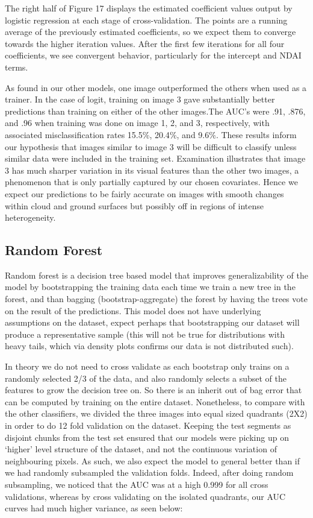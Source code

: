 \documentclass{article}\usepackage[]{graphicx}\usepackage[]{color}
\begin{document}
The right half of Figure 17 displays the estimated coefficient values output by logistic regression at each stage of cross-validation. The points are a running average of the previously estimated coefficients, so we expect them to converge towards the higher iteration values. After the first few iterations for all four coefficients, we see convergent behavior, particularly for the intercept and NDAI terms. 

As found in our other models, one image outperformed the others when used as a trainer. In the case of logit, training on image 3 gave substantially better predictions than training on either of the other images.The AUC's were .91, .876, and .96 when training was done on image 1, 2, and 3, respectively, with associated misclassification rates 15.5$\%$, 20.4$\%$, and 9.6$\%$. These results inform our hypothesis that images similar to image 3 will be difficult to classify unless similar data were included in the training set. Examination illustrates that image 3 has much sharper variation in its visual features than the other two images, a phenomenon that is only partially captured by our chosen covariates. Hence we expect our predictions to be fairly accurate on images with smooth changes within cloud and ground surfaces but possibly off in regions of intense heterogeneity.

\subsection{Random Forest}

Random forest is a decision tree based model that improves generalizability of the model by bootstrapping the training data each time we train a new tree in the forest, and than bagging (bootstrap-aggregate) the forest by having the trees vote on the result of the predictions.  This model does not have underlying assumptions on the dataset, expect perhaps that bootstrapping our dataset will produce a representative sample (this will not be true for distributions with heavy tails, which via density plots confirms our data is not distributed such). 

In theory we do not need to cross validate as each bootstrap only trains on a randomly selected 2/3 of the data, and also randomly selects a subset of the features to grow the decision tree on.  So there is an inherit out of bag error that can be computed by training on the entire dataset.  Nonetheless, to compare with the other classifiers, we divided the three images into equal sized quadrants (2X2) in order to do 12 fold validation on the dataset. Keeping the test segments as disjoint chunks from the test set ensured that our models were picking up on `higher' level structure of the dataset, and not the continuous variation of neighbouring pixels.  As such, we also expect the model to general better than if we had randomly subsampled the validation folds.  Indeed, after doing random subsampling, we noticed that the AUC was at a high 0.999 for all cross validations, whereas by cross validating on the isolated quadrants, our AUC curves had much higher variance, as seen below: \\
\end{document}
